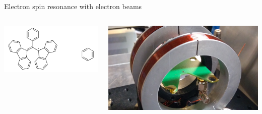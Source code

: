 \documentclass[final]{beamer}
\begin{document}
\begin{frame}[fragile]{}
\begin{columns}[T]
\begin{column}{.49\linewidth}
\begin{block}{\large Electron spin resonance with electron beams}
        \begin{columns}
          \begin{column}{0.6\columnwidth}
            \includegraphics[width=0.67\columnwidth]{figures/bdpa.png}
          \end{column}
          \begin{column}{0.4\columnwidth}
            \includegraphics[width=\columnwidth]{figures/esrsetuppcb.jpg}
          \end{column}
        \end{columns}


\end{block}
\end{column}
\end{columns}
\end{frame}
\end{document}
